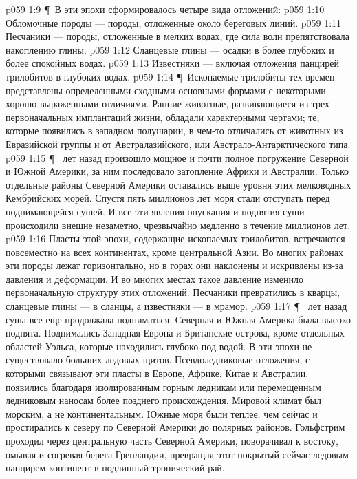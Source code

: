 \vs p059 1:9 \P\ В эти эпохи сформировалось четыре вида отложений:
\vs p059 1:10 \bibnobreakspace Обломочные породы --- породы, отложенные около береговых линий.
\vs p059 1:11 \bibnobreakspace Песчаники --- породы, отложенные в мелких водах, где сила волн препятствовала накоплению глины.
\vs p059 1:12 \bibnobreakspace Сланцевые глины --- осадки в более глубоких и более спокойных водах.
\vs p059 1:13 \bibnobreakspace Известняки --- включая отложения панцирей трилобитов в глубоких водах.
\vs p059 1:14 \P\ Ископаемые трилобиты тех времен представлены определенными сходными основными формами с некоторыми хорошо выраженными отличиями. Ранние животные, развивающиеся из трех первоначальных имплантаций жизни, обладали характерными чертами; те, которые появились в западном полушарии, в чем\hyp{}то отличались от животных из Евразийской группы и от Австралазийского, или Австрало\hyp{}Антарктического типа.
\vs p059 1:15 \P\  лет назад произошло мощное и почти полное погружение Северной и Южной Америки, за ним последовало затопление Африки и Австралии. Только отдельные районы Северной Америки оставались выше уровня этих мелководных Кембрийских морей. Спустя пять миллионов лет моря стали отступать перед поднимающейся сушей. И все эти явления опускания и поднятия суши происходили внешне незаметно, чрезвычайно медленно в течение миллионов лет.
\vs p059 1:16 Пласты этой эпохи, содержащие ископаемых трилобитов, встречаются повсеместно на всех континентах, кроме центральной Азии. Во многих районах эти породы лежат горизонтально, но в горах они наклонены и искривлены из\hyp{}за давления и деформации. И во многих местах такое давление изменило первоначальную структуру этих отложений. Песчаники превратились в кварцы, сланцевые глины --- в сланцы, а известняки --- в мрамор.
\vs p059 1:17 \P\  лет назад суша все еще продолжала подниматься. Северная и Южная Америка была высоко поднята. Поднимались Западная Европа и Британские острова, кроме отдельных областей Уэльса, которые находились глубоко под водой. В эти эпохи не существовало больших ледовых щитов. Псевдоледниковые отложения, с которыми связывают эти пласты в Европе, Африке, Китае и Австралии, появились благодаря изолированным горным ледникам или перемещенным ледниковым наносам более позднего происхождения. Мировой климат был морским, а не континентальным. Южные моря были теплее, чем сейчас и простирались к северу по Северной Америки до полярных районов. Гольфстрим проходил через центральную часть Северной Америки, поворачивал к востоку, омывая и согревая берега Гренландии, превращая этот покрытый сейчас ледовым панцирем континент в подлинный тропический рай.
